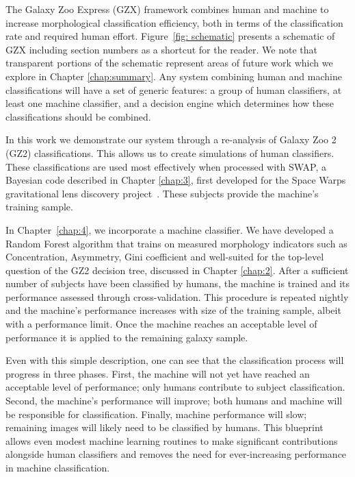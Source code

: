 The Galaxy Zoo Express (GZX) framework combines human and machine to increase morphological classification efficiency, both in terms of the classification rate and required human effort. Figure~\ref{fig: schematic} presents a schematic of GZX including section numbers as a shortcut for the reader. We note that transparent portions  of the schematic represent areas of future work which we explore in Chapter \ref{chap:summary}. Any system combining human and machine classifications will have a set of generic features: a group of human classifiers, at least one machine classifier, and a decision engine which determines how these classifications should be combined.

In this work we demonstrate our system through a re-analysis of  Galaxy Zoo 2 (GZ2) classifications. This allows us to  create simulations of human classifiers. These classifications are used most effectively when processed with SWAP, a Bayesian code described in Chapter \ref{chap:3}, first developed for the Space Warps gravitational lens discovery project~\citep{Marshall2016}. These subjects provide the machine's training sample. 

In Chapter~\ref{chap:4}, we incorporate a machine classifier. We have developed a Random Forest algorithm that trains on measured morphology indicators such as Concentration, Asymmetry, Gini coefficient and  well-suited for the top-level question of the GZ2 decision tree, discussed in Chapter \ref{chap:2}. After a sufficient number of subjects have been classified by humans, the machine is trained and its performance assessed through cross-validation. This procedure is repeated nightly and the machine's performance increases with size of the training sample, albeit with a performance limit. Once the machine reaches an acceptable level of performance it is applied to the remaining galaxy sample. 

Even with this simple description, one can see that the classification process will progress in three phases.  First, the machine will not yet have reached an acceptable level of performance; only humans contribute to subject classification. Second, the machine's performance will improve; both humans and machine will be responsible for classification. Finally, machine performance will slow; remaining images will likely need to be classified by humans. This blueprint allows even modest machine learning routines to make significant contributions alongside human classifiers and removes the need for ever-increasing performance in machine classification.